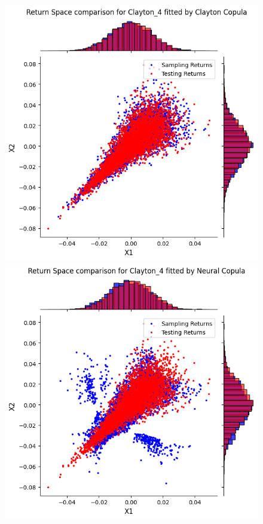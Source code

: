 \begin{figure}
\begin{minipage}{0.49\textwidth}
    \end{minipage}
    \vfill
    \begin{minipage}{0.49\textwidth}
        \centering
        \includegraphics[width=\textwidth]{5ResultsDiscussion/pictures/PortfolioTest/Port4Clayton.png}
    \end{minipage}
    \hfill
    \begin{minipage}{0.49\textwidth}
        \centering
        \includegraphics[width=\textwidth]{5ResultsDiscussion/pictures/PortfolioTest/Port4NC.png}

\end{minipage}
\end{figure}

